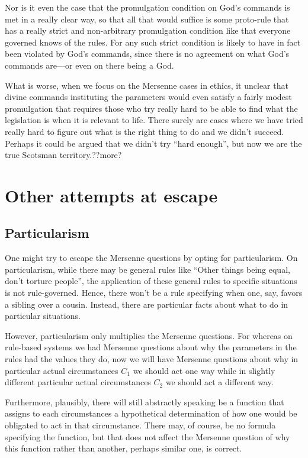 Nor is it even the case that the promulgation condition on God's commands is met in a really clear way, so that all that
would suffice is some proto-rule that has a really strict and non-arbitrary promulgation condition like that everyone 
governed knows of the rules. For any such strict condition is likely to have in fact been violated by God's commands, since
there is no agreement on what God's commands are---or even on there being a God.

What is worse, when we focus on the Mersenne cases in ethics, it unclear that divine commands instituting the parameters
would even satisfy a fairly modest promulgation that requires those who try really hard to be able to find what the legislation 
is when it is relevant to life. There surely are cases where we have tried really hard to figure out what is the right thing
to do and we didn't succeed. Perhaps it could be argued that we didn't try ``hard enough'', but now we are the true
Scotsman territory.??more?

\section{Other attempts at escape}
\subsection{Particularism}
One might try to escape the Mersenne questions by opting for particularism. On particularism, while there may be general rules
like ``Other things being equal, don't torture people'', the application of these general rules to specific situations is not
rule-governed. Hence, there won't be a rule specifying when one, say, favors a sibling over a cousin. Instead, there are 
particular facts about what to do in particular situations. 

However, particularism only multiplies the Mersenne questions. For whereas on rule-based systems we had Mersenne questions
about why the parameters in the rules had the values they do, now we will have Mersenne questions about why in particular actual
circumstances $C_1$ we should act one way while in slightly different particular actual circumstances $C_2$ we should act a
different way.

Furthermore, plausibly, there will still abstractly speaking be a function that assigns to each circumstances a hypothetical determination
of how one would be obligated to act in that circumstance. There may, of course, be no formula specifying the function, but that does not
affect the Mersenne question of why this function rather than another, perhaps similar one, is correct.

